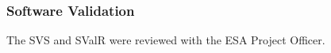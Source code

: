 \subsubsection{Software Validation}
The SVS and SValR were reviewed with the ESA Project Officer.



